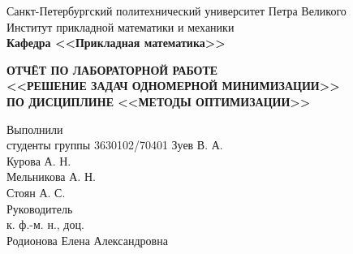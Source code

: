 \documentclass[main.tex]{subfiles}
\begin{document}
\begin{titlepage}
\begin{center}
	\begin{large}
		Санкт-Петербургский политехнический университет Петра Великого\\
		Институт прикладной математики и механики\\
		\textbf{Кафедра <<Прикладная математика>>}\\
	\end{large}
	\vfill
	\Large{\textbf{ОТЧЁТ ПО ЛАБОРАТОРНОЙ РАБОТЕ\\
	<<РЕШЕНИЕ ЗАДАЧ ОДНОМЕРНОЙ МИНИМИЗАЦИИ>>\\
	ПО ДИСЦИПЛИНЕ <<МЕТОДЫ ОПТИМИЗАЦИИ>>}}
\end{center}
\vfill
\flushleft
Выполнили\\
студенты группы 3630102/70401
\flushright
Зуев В. А.\\
Курова А. Н.\\
Мельникова А. Н.\\
Стоян А. С.\\ 
\flushleft
Руководитель\\
к. ф.-м. н., доц.\\
\flushright
Родионова Елена Александровна
\vfill
{}
\end{titlepage}
\end{document}
